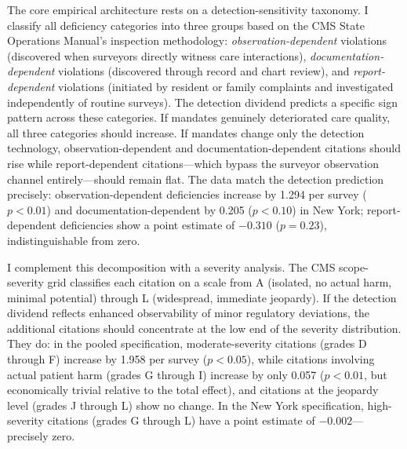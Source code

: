 \documentclass[12pt]{article}
\begin{document}
The core empirical architecture rests on a detection-sensitivity taxonomy. I classify all deficiency categories into three groups based on the CMS State Operations Manual's inspection methodology: \textit{observation-dependent} violations (discovered when surveyors directly witness care interactions), \textit{documentation-dependent} violations (discovered through record and chart review), and \textit{report-dependent} violations (initiated by resident or family complaints and investigated independently of routine surveys). The detection dividend predicts a specific sign pattern across these categories. If mandates genuinely deteriorated care quality, all three categories should increase. If mandates change only the detection technology, observation-dependent and documentation-dependent citations should rise while report-dependent citations---which bypass the surveyor observation channel entirely---should remain flat. The data match the detection prediction precisely: observation-dependent deficiencies increase by 1.294 per survey ($p < 0.01$) and documentation-dependent by 0.205 ($p < 0.10$) in New York; report-dependent deficiencies show a point estimate of $-0.310$ ($p = 0.23$), indistinguishable from zero.

I complement this decomposition with a severity analysis. The CMS scope-severity grid classifies each citation on a scale from A (isolated, no actual harm, minimal potential) through L (widespread, immediate jeopardy). If the detection dividend reflects enhanced observability of minor regulatory deviations, the additional citations should concentrate at the low end of the severity distribution. They do: in the pooled specification, moderate-severity citations (grades D through F) increase by 1.958 per survey ($p < 0.05$), while citations involving actual patient harm (grades G through I) increase by only 0.057 ($p < 0.01$, but economically trivial relative to the total effect), and citations at the jeopardy level (grades J through L) show no change. In the New York specification, high-severity citations (grades G through L) have a point estimate of $-0.002$---precisely zero.
\end{document}
